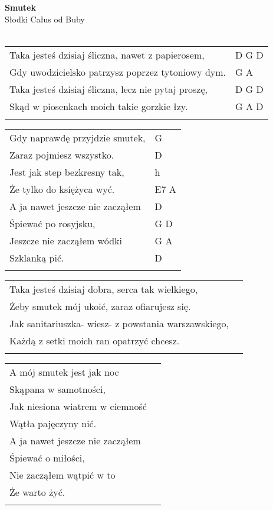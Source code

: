 \documentclass[a5paper]{article}
\begin{document}


\noindent
\fontsize{12pt}{15pt}\selectfont
\textbf{Smutek} \\
\fontsize{8pt}{10pt}\selectfont
Słodki Całus od Buby \\ \\
\fontsize{10pt}{12pt}\selectfont
{}
\begin{tabular}{@{}p{8.50cm}p{3cm}@{}}
\noindent
Taka jesteś dzisiaj śliczna, nawet z papierosem, & D G D \\
Gdy uwodzicielsko patrzysz poprzez tytoniowy dym. & G A \\
Taka jesteś dzisiaj śliczna, lecz nie pytaj proszę, & D G D \\
Skąd w piosenkach moich takie gorzkie łzy. & G A D \\ \\
\end{tabular}

\noindent
\begin{tabular}{@{}p{7.50cm}p{3cm}@{}}
Gdy naprawdę przyjdzie smutek, & G \\
Zaraz pojmiesz wszystko. & D \\
Jest jak step bezkresny tak, & h \\
Że tylko do księżyca wyć. & E7 A \\
A ja nawet jeszcze nie zacząłem & D \\
Śpiewać po rosyjsku, & G D \\
Jeszcze nie zacząłem wódki & G A \\
Szklanką pić. & D \\ \\
\end{tabular}

\noindent
\begin{tabular}{@{}p{10.50cm}p{3cm}@{}}
Taka jesteś dzisiaj dobra, serca tak wielkiego, \\
Żeby smutek mój ukoić, zaraz ofiarujesz się. \\
Jak sanitariuszka- wiesz- z powstania warszawskiego, \\
Każdą z setki moich ran opatrzyć chcesz. \\ \\
\end{tabular}

\noindent
\begin{tabular}{@{}p{7.50cm}p{3cm}@{}}
A mój smutek jest jak noc \\
Skąpana w samotności, \\
Jak niesiona wiatrem w ciemność \\
Wątła pajęczyny nić. \\
A ja nawet jeszcze nie zacząłem \\
Śpiewać o miłości, \\
Nie zacząłem wątpić w to \\
Że warto żyć. \\ \\
\end{tabular}
\end{document}
